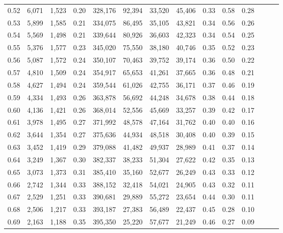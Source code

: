 \begin{tabular}{rrrrrrrrrrrrrr}
0.52 &   6,071 &  1,523 &  0.20 &  328,176 &   92,394 &  33,520 &  45,406 &  0.33 &  0.58 &      0.28 \\
0.53 &   5,899 &  1,585 &  0.21 &  334,075 &   86,495 &  35,105 &  43,821 &  0.34 &  0.56 &      0.26 \\
0.54 &   5,569 &  1,498 &  0.21 &  339,644 &   80,926 &  36,603 &  42,323 &  0.34 &  0.54 &      0.25 \\
0.55 &   5,376 &  1,577 &  0.23 &  345,020 &   75,550 &  38,180 &  40,746 &  0.35 &  0.52 &      0.23 \\
0.56 &   5,087 &  1,572 &  0.24 &  350,107 &   70,463 &  39,752 &  39,174 &  0.36 &  0.50 &      0.22 \\
0.57 &   4,810 &  1,509 &  0.24 &  354,917 &   65,653 &  41,261 &  37,665 &  0.36 &  0.48 &      0.21 \\
0.58 &   4,627 &  1,494 &  0.24 &  359,544 &   61,026 &  42,755 &  36,171 &  0.37 &  0.46 &      0.19 \\
0.59 &   4,334 &  1,493 &  0.26 &  363,878 &   56,692 &  44,248 &  34,678 &  0.38 &  0.44 &      0.18 \\
0.60 &   4,136 &  1,421 &  0.26 &  368,014 &   52,556 &  45,669 &  33,257 &  0.39 &  0.42 &      0.17 \\
0.61 &   3,978 &  1,495 &  0.27 &  371,992 &   48,578 &  47,164 &  31,762 &  0.40 &  0.40 &      0.16 \\
0.62 &   3,644 &  1,354 &  0.27 &  375,636 &   44,934 &  48,518 &  30,408 &  0.40 &  0.39 &      0.15 \\
0.63 &   3,452 &  1,419 &  0.29 &  379,088 &   41,482 &  49,937 &  28,989 &  0.41 &  0.37 &      0.14 \\
0.64 &   3,249 &  1,367 &  0.30 &  382,337 &   38,233 &  51,304 &  27,622 &  0.42 &  0.35 &      0.13 \\
0.65 &   3,073 &  1,373 &  0.31 &  385,410 &   35,160 &  52,677 &  26,249 &  0.43 &  0.33 &      0.12 \\
0.66 &   2,742 &  1,344 &  0.33 &  388,152 &   32,418 &  54,021 &  24,905 &  0.43 &  0.32 &      0.11 \\
0.67 &   2,529 &  1,251 &  0.33 &  390,681 &   29,889 &  55,272 &  23,654 &  0.44 &  0.30 &      0.11 \\
0.68 &   2,506 &  1,217 &  0.33 &  393,187 &   27,383 &  56,489 &  22,437 &  0.45 &  0.28 &      0.10 \\
0.69 &   2,163 &  1,188 &  0.35 &  395,350 &   25,220 &  57,677 &  21,249 &  0.46 &  0.27 &      0.09 \\

\end{tabular}
